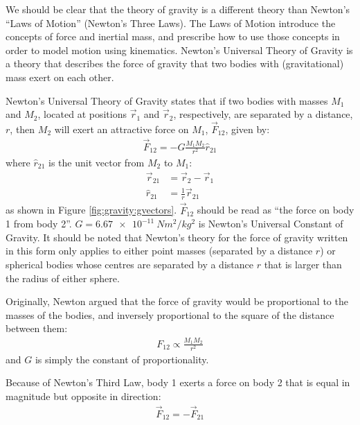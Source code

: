 We should be clear that the theory of gravity is a different theory than Newton's ``Laws of Motion'' (Newton's Three Laws). The Laws of Motion introduce the concepts of force and inertial mass, and prescribe how to use those concepts in order to model motion using kinematics. Newton's Universal Theory of Gravity is a theory that describes the force of gravity that two bodies with (gravitational) mass exert on each other.

Newton's Universal Theory of Gravity states that if two bodies with masses $M_1$ and $M_2$, located at positions $\vec r_1$ and $\vec r_2$, respectively, are separated by a distance, $r$, then $M_2$ will exert an attractive force on $M_1$, $\vec F_{12}$, given by:
\begin{align}
\vec F_{12}=-G\frac{M_1M_2}{r^2}\hat r_{21}
\end{align}
where $\hat r_{21}$ is the unit vector from $M_2$ to $M_1$:
\begin{align*}
\vec r_{21} &= \vec r_2 - \vec r_1\\
\hat r_{21} &= \frac{1}{r} \vec r_{21}
\end{align*}
as shown in Figure \ref{fig:gravity:gvectors}. $\vec F_{12}$ should be read as ``the force on body 1 from body 2''. $G=\SI{6.67e-11}{Nm^2/kg^2}$ is Newton's Universal Constant of Gravity. It should be noted that Newton's theory for the force of gravity written in this form only applies to either point masses (separated by a distance $r$) or spherical bodies whose centres are separated by a distance $r$ that is larger than the radius of either sphere.

Originally, Newton argued that the force of gravity would be proportional to the masses of the bodies, and inversely proportional to the square of the distance between them:
\begin{align*}
F_{12}\propto \frac{M_1M_2}{r^2}
\end{align*}
and $G$ is simply the constant of proportionality.

Because of Newton's Third Law, body 1 exerts a force on body 2 that is equal in magnitude but opposite in direction:
\begin{align*}
\vec F_{12} = -\vec F_{21}
\end{align*} 

